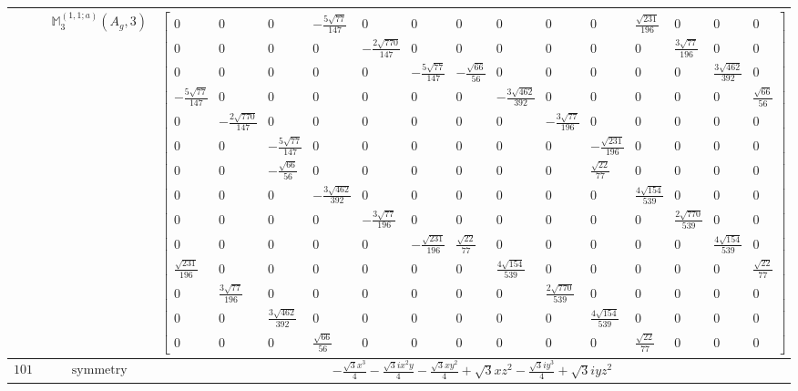 \documentclass[fleqn,8pt,landscape]{jsarticle}
\begin{document}
\begin{longtable}{ccc}
$  $ & $ \mathbb{M}_{3}^{(1,1;a)}(A_{g},3) $ & $ \begin{bmatrix} 0 & 0 & 0 & - \frac{5 \sqrt{77}}{147} & 0 & 0 & 0 & 0 & 0 & 0 & \frac{\sqrt{231}}{196} & 0 & 0 & 0 \\ 0 & 0 & 0 & 0 & - \frac{2 \sqrt{770}}{147} & 0 & 0 & 0 & 0 & 0 & 0 & \frac{3 \sqrt{77}}{196} & 0 & 0 \\ 0 & 0 & 0 & 0 & 0 & - \frac{5 \sqrt{77}}{147} & - \frac{\sqrt{66}}{56} & 0 & 0 & 0 & 0 & 0 & \frac{3 \sqrt{462}}{392} & 0 \\ - \frac{5 \sqrt{77}}{147} & 0 & 0 & 0 & 0 & 0 & 0 & - \frac{3 \sqrt{462}}{392} & 0 & 0 & 0 & 0 & 0 & \frac{\sqrt{66}}{56} \\ 0 & - \frac{2 \sqrt{770}}{147} & 0 & 0 & 0 & 0 & 0 & 0 & - \frac{3 \sqrt{77}}{196} & 0 & 0 & 0 & 0 & 0 \\ 0 & 0 & - \frac{5 \sqrt{77}}{147} & 0 & 0 & 0 & 0 & 0 & 0 & - \frac{\sqrt{231}}{196} & 0 & 0 & 0 & 0 \\ 0 & 0 & - \frac{\sqrt{66}}{56} & 0 & 0 & 0 & 0 & 0 & 0 & \frac{\sqrt{22}}{77} & 0 & 0 & 0 & 0 \\ 0 & 0 & 0 & - \frac{3 \sqrt{462}}{392} & 0 & 0 & 0 & 0 & 0 & 0 & \frac{4 \sqrt{154}}{539} & 0 & 0 & 0 \\ 0 & 0 & 0 & 0 & - \frac{3 \sqrt{77}}{196} & 0 & 0 & 0 & 0 & 0 & 0 & \frac{2 \sqrt{770}}{539} & 0 & 0 \\ 0 & 0 & 0 & 0 & 0 & - \frac{\sqrt{231}}{196} & \frac{\sqrt{22}}{77} & 0 & 0 & 0 & 0 & 0 & \frac{4 \sqrt{154}}{539} & 0 \\ \frac{\sqrt{231}}{196} & 0 & 0 & 0 & 0 & 0 & 0 & \frac{4 \sqrt{154}}{539} & 0 & 0 & 0 & 0 & 0 & \frac{\sqrt{22}}{77} \\ 0 & \frac{3 \sqrt{77}}{196} & 0 & 0 & 0 & 0 & 0 & 0 & \frac{2 \sqrt{770}}{539} & 0 & 0 & 0 & 0 & 0 \\ 0 & 0 & \frac{3 \sqrt{462}}{392} & 0 & 0 & 0 & 0 & 0 & 0 & \frac{4 \sqrt{154}}{539} & 0 & 0 & 0 & 0 \\ 0 & 0 & 0 & \frac{\sqrt{66}}{56} & 0 & 0 & 0 & 0 & 0 & 0 & \frac{\sqrt{22}}{77} & 0 & 0 & 0 \end{bmatrix} $ \\ \hline
$ 1010 $ & $ \text{symmetry} $ & $ - \frac{\sqrt{3} x^{3}}{4} - \frac{\sqrt{3} i x^{2} y}{4} - \frac{\sqrt{3} x y^{2}}{4} + \sqrt{3} x z^{2} - \frac{\sqrt{3} i y^{3}}{4} + \sqrt{3} i y z^{2} $ \\

\end{longtable}
\end{document}
